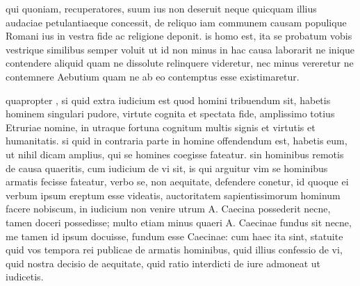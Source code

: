  qui quoniam, recuperatores, suum ius non deseruit neque quicquam illius audaciae petulantiaeque concessit, de reliquo iam communem causam populique Romani ius in vestra fide ac religione deponit. is homo est, ita se probatum vobis vestrique similibus semper voluit ut id non minus in hac causa laborarit ne inique contendere aliquid quam ne dissolute relinquere videretur, nec minus vereretur ne contemnere Aebutium quam ne ab eo contemptus esse existimaretur.

 quapropter , si quid extra iudicium est quod homini tribuendum sit, habetis hominem singulari pudore, virtute cognita et spectata fide, amplissimo totius Etruriae nomine, in utraque fortuna cognitum multis signis et virtutis et humanitatis. si quid in contraria parte in homine offendendum est, habetis eum, ut nihil dicam amplius, qui se homines coegisse fateatur. sin hominibus remotis de causa quaeritis, cum iudicium de vi sit, is qui arguitur vim se hominibus armatis fecisse fateatur, verbo se, non aequitate, defendere conetur, id quoque ei verbum ipsum ereptum esse videatis, auctoritatem sapientissimorum hominum facere nobiscum, in iudicium non venire utrum A. Caecina possederit necne, tamen doceri possedisse; multo etiam minus quaeri A. Caecinae fundus sit necne, me tamen id ipsum docuisse, fundum esse Caecinae: cum haec ita sint, statuite quid vos tempora rei publicae de armatis hominibus, quid illius confessio de vi, quid nostra decisio de aequitate, quid ratio interdicti de iure admoneat ut iudicetis.

